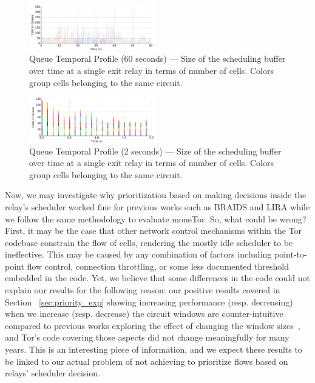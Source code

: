 \begin{figure} \centering
  \includegraphics[width=0.49\textwidth]{images/scheduling_far.png}
  \caption[Queue Temporal Profile (60 seconds)]{Queue Temporal Profile
      (60 seconds) --- Size of the scheduling buffer over time at a single exit
    relay in terms of number of cells. Colors group cells belonging to the same circuit.}
  \label{fig:scheduling_far}
\end{figure}

\begin{figure} \centering
  \includegraphics[width=0.49\textwidth]{images/scheduling_close.png}
  \caption[Queue Temporal Profile (2 seconds)]{Queue Temporal Profile
      (2 seconds) --- Size of the scheduling buffer over time at a single exit
    relay in terms of number of cells. Colors group cells belonging to the same
    circuit.}
  \label{fig:scheduling_close}
\end{figure}

Now, we may investigate why prioritization based on making decisions inside the 
relay's scheduler worked fine for previous works such as BRAIDS and LIRA while we 
follow the same methodology to evaluate moneTor. So, what could be wrong? First, 
it may be the case
that other network control mechanisms within the Tor codebase constrain the flow
of cells, rendering the mostly idle scheduler to be ineffective. This may be
caused by any combination of factors including point-to-point flow control,
connection throttling, or some less documented threshold embedded in the
code. Yet, we believe that some differences in the code could not explain our 
results for the following reason: our positive results covered in Section~
\ref{sec:priority_exp} showing
increasing performance (resp. decreasing) when we increase (resp. decrease) the 
circuit windows are counter-intuitive compared to previous works exploring the 
effect of changing the window sizes~\cite{archive-2009-mail, kiraly2008solving, 
dingledine2009performance}, and Tor's code covering those aspects did not change 
meaningfully for many years. This is an interesting piece of information, and we 
expect these results to be linked to our actual 
problem of not achieving to prioritize flows based on relays' scheduler decision.

